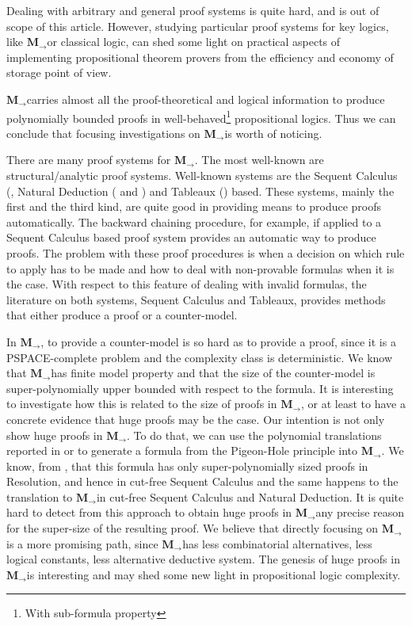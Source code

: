 \documentclass[11pt]{llncs}
\newcommand{\mil}{\ensuremath{\mathbf{M}_{\rightarrow}}}
\begin{document}
Dealing with arbitrary and general proof systems is quite hard, and is out of scope of this article. However, studying particular proof systems for key logics, like \mil or classical logic, can shed some light on practical aspects of implementing propositional theorem provers from the efficiency and economy of storage point of view.    

\mil carries almost all the proof-theoretical and logical information to produce polynomially bounded proofs in well-behaved\footnote{With sub-formula property} propositional logics. Thus we can conclude that focusing investigations on \mil is worth of noticing. 

There are many proof systems for \mil. The most well-known are structural/analytic  proof systems. Well-known systems are the Sequent Calculus (\cite{Gentzen}, Natural Deduction (\cite{Gentzen} and \cite{Prawitz}) and Tableaux (\cite{Beth,Smullyan}) based. These systems, mainly the first and the third kind, are quite good in providing means to produce proofs automatically. The backward chaining procedure, for example, if applied to a Sequent Calculus based proof system provides an automatic way to produce proofs. The problem with these proof procedures is when a decision on which rule to apply has to be made and how to deal with non-provable formulas when it is the case. With respect to this feature of dealing with invalid formulas, the  literature on both systems, Sequent Calculus and Tableaux, provides methods that either produce a proof or a counter-model. 

In \mil,  to provide a counter-model is so hard as to provide a proof, since it is a PSPACE-complete problem and the complexity class is deterministic. We know that \mil has finite model property and that the size of the counter-model is super-polynomially  upper bounded with respect to  the formula. It is interesting to investigate how this is related to the size of proofs in \mil, or at least to have a concrete evidence that huge proofs may be the case. Our intention is not only show huge proofs in \mil. To do that, we can use the polynomial translations reported in \cite{Statman} or \cite{Haeusler} to generate a formula from the Pigeon-Hole principle into \mil. We know, from \cite{Haken}, that this formula has only super-polynomially sized proofs in Resolution, and hence in cut-free Sequent Calculus and the same happens to the translation to \mil in cut-free Sequent Calculus and Natural Deduction. It is quite hard to detect from this approach to obtain huge proofs in \mil any precise reason for the super-size of the resulting proof. We believe that directly focusing on \mil is a more promising path, since \mil has less combinatorial alternatives, less logical constants, less alternative deductive system. The genesis of huge proofs in \mil is interesting and may shed some new light in propositional logic complexity. 
\end{document}
